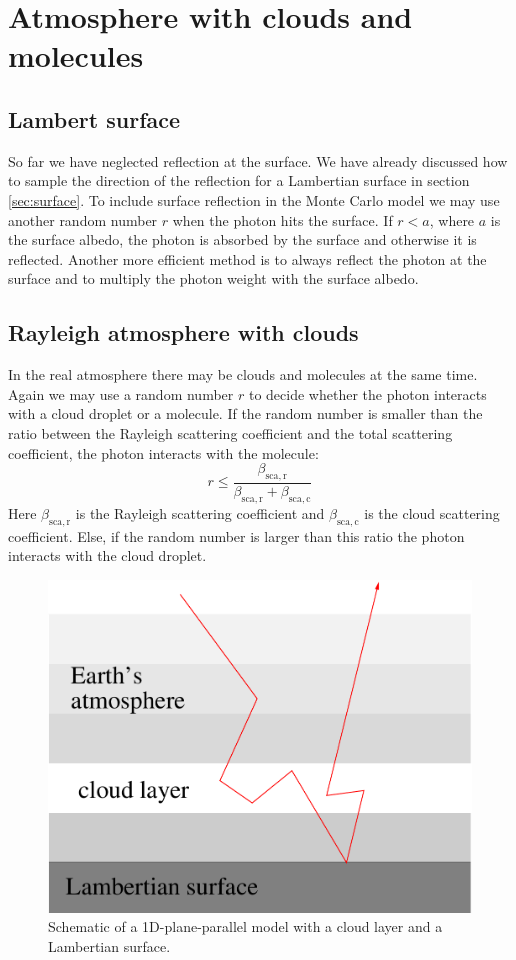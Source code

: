 \documentclass[12pt,twoside,a4paper]{article}
\begin{document}
\cleardoublepage

\section{Atmosphere with clouds and molecules} 

\subsection{Lambert surface} 

So far we have neglected reflection at the surface. We have
already discussed how to sample the direction of the reflection for a
Lambertian surface in section \ref{sec:surface}. 
To include surface reflection in the Monte Carlo model we may use
another random number $r$ when the photon hits the surface. If $r<a$,
where $a$ is the surface albedo, the photon is absorbed by the surface
and otherwise it is reflected.
Another more efficient method is to always reflect the photon at the
surface and to multiply the photon weight with the surface albedo.
 
\subsection{Rayleigh atmosphere with clouds}

In the real atmosphere there may be clouds and molecules at the
same time. Again we may use a random number $r$ to decide
whether the photon interacts with a cloud droplet or a molecule. 
If the random number is smaller than the ratio between the Rayleigh
scattering coefficient and the total scattering coefficient, 
the photon interacts with the molecule:
\begin{equation}
  r \le \frac{\beta_\mathrm{sca,r}}{\beta_\mathrm{sca,r}+\beta_\mathrm{sca,c}}
\end{equation}
Here $\beta_\mathrm{sca,r}$ is the Rayleigh scattering coefficient
and $\beta_\mathrm{sca,c}$ is the cloud scattering coefficient. Else,
if the random number is larger than this ratio the photon interacts
with the cloud droplet. 

\begin{figure}[htbp]
  \centering
  \includegraphics[width=0.8\hsize]{./figs/domain_cloudy.pdf}
  \caption{Schematic of a 1D-plane-parallel model with a 
    cloud layer and a Lambertian surface.} 
    \label{fig:cloudy}
\end{figure}
\end{document}
